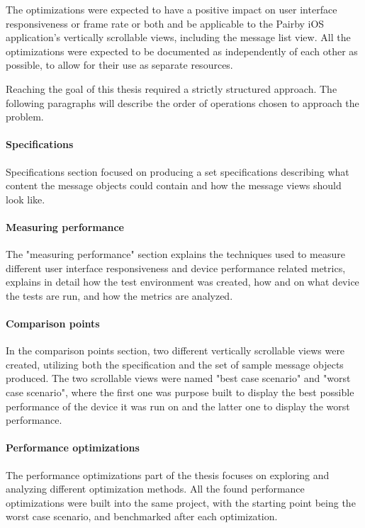 \documentclass[a4paper,12pt]{article}
\begin{document}
The optimizations were expected to have a positive impact on user interface responsiveness or frame rate or both and be applicable to the Pairby iOS application's vertically scrollable views, including the message list view. All the optimizations were expected to be documented as independently of each other as possible, to allow for their use as separate resources.

Reaching the goal of this thesis required a strictly structured approach. The following paragraphs will describe the order of operations chosen to approach the problem.

\paragraph*{Specifications}
Specifications section focused on producing a set specifications describing what content the message objects could contain and how the message views should look like.

\paragraph*{Measuring performance}
The "measuring performance" section explains the techniques used to measure different user interface responsiveness and device performance related metrics, explains in detail how the test environment was created, how and on what device the tests are run, and how the metrics are analyzed.

\paragraph*{Comparison points}
In the comparison points section, two different vertically scrollable views were created, utilizing both the specification and the set of sample message objects produced. The two scrollable views were named "best case scenario" and "worst case scenario", where the first one was purpose built to display the best possible performance of the device it was run on and the latter one to display the worst performance.

\paragraph*{Performance optimizations}
The performance optimizations part of the thesis focuses on exploring and analyzing different optimization methods. All the found performance optimizations were built into the same project, with the starting point being the worst case scenario, and benchmarked after each optimization.
\end{document}
